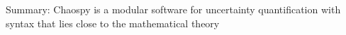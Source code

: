 \documentclass[handout]{beamer}
\begin{document}
\begin{frame}{Summary: Chaospy is a modular software for uncertainty quantification with syntax that lies close to the mathematical theory}
%
%
%
%
%
%

\end{frame}
\end{document}
